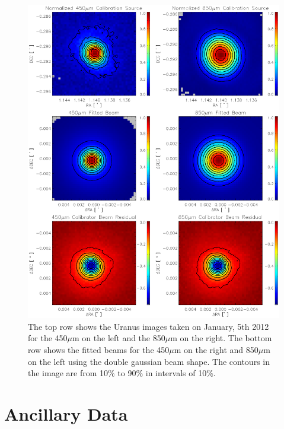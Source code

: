 \begin{figure}
  \label{fig_calib}
  \centering
  \includegraphics[width=1.\textwidth, trim={0 5cm 0 0}]{obs_imgs/calib_beams.eps}
  \caption[SCUBA-2 Calibration and Beams]{The top row shows the Uranus images taken on January, 5th 2012 for the 450$\mu$m on the left and the 850$\mu$m on the right.  The bottom row shows the fitted beams for the 450$\mu$m on the right and 850$\mu$m on the left using the double gaussian beam shape. The contours in the image are from 10\% to 90\% in intervals of 10\%.}
\end{figure}

\section{Ancillary Data}

